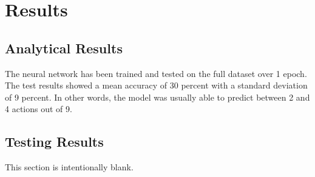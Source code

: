 \chapter{Results}



\section{Analytical Results}

The neural network has been trained and tested on the full dataset over 1 epoch. The test results showed a mean accuracy of 30 percent with a standard deviation of 9 percent. In other words, the model was usually able to predict between 2 and 4 actions out of 9.





\section{Testing Results}

This section is intentionally blank.

